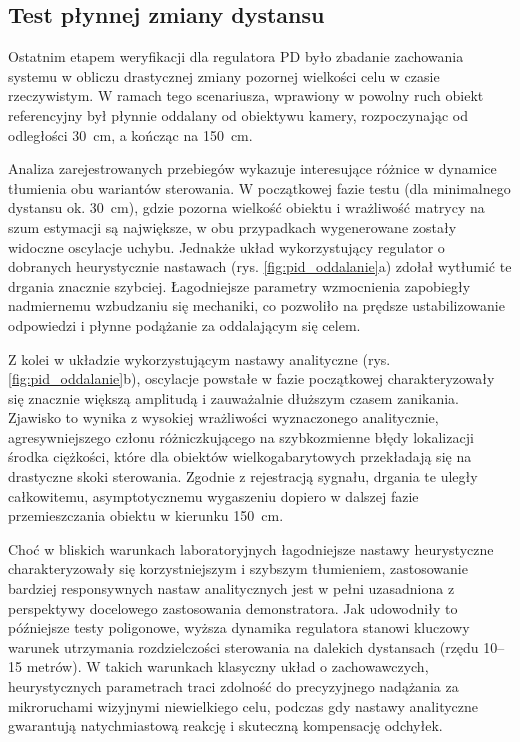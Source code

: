 \documentclass[a4paper,twoside,12pt]{book}
\begin{document}
\subsection{Test płynnej zmiany dystansu}
\label{subsec:pid_oddalanie}

Ostatnim etapem weryfikacji dla regulatora PD było zbadanie zachowania systemu w obliczu drastycznej zmiany pozornej wielkości celu w czasie rzeczywistym. W ramach tego scenariusza, wprawiony w powolny ruch obiekt referencyjny był płynnie oddalany od obiektywu kamery, rozpoczynając od odległości 30~cm, a kończąc na 150~cm. 

Analiza zarejestrowanych przebiegów wykazuje interesujące różnice w dynamice tłumienia obu wariantów sterowania. W początkowej fazie testu (dla minimalnego dystansu ok. 30~cm), gdzie pozorna wielkość obiektu i wrażliwość matrycy na szum estymacji są największe, w obu przypadkach wygenerowane zostały widoczne oscylacje uchybu. Jednakże układ wykorzystujący regulator o dobranych heurystycznie nastawach (rys. \ref{fig:pid_oddalanie}a) zdołał wytłumić te drgania znacznie szybciej. Łagodniejsze parametry wzmocnienia zapobiegły nadmiernemu wzbudzaniu się mechaniki, co pozwoliło na prędsze ustabilizowanie odpowiedzi i płynne podążanie za oddalającym się celem.

Z kolei w układzie wykorzystującym nastawy analityczne (rys. \ref{fig:pid_oddalanie}b), oscylacje powstałe w fazie początkowej charakteryzowały się znacznie większą amplitudą i zauważalnie dłuższym czasem zanikania. Zjawisko to wynika z wysokiej wrażliwości wyznaczonego analitycznie, agresywniejszego członu różniczkującego na szybkozmienne błędy lokalizacji środka ciężkości, które dla obiektów wielkogabarytowych przekładają się na drastyczne skoki sterowania. Zgodnie z rejestracją sygnału, drgania te uległy całkowitemu, asymptotycznemu wygaszeniu dopiero w dalszej fazie przemieszczania obiektu w kierunku 150~cm.

Choć w bliskich warunkach laboratoryjnych łagodniejsze nastawy heurystyczne charakteryzowały się korzystniejszym i szybszym tłumieniem, zastosowanie bardziej responsywnych nastaw analitycznych jest w pełni uzasadniona z perspektywy docelowego zastosowania demonstratora. Jak udowodniły to późniejsze testy poligonowe, wyższa dynamika regulatora stanowi kluczowy warunek utrzymania rozdzielczości sterowania na dalekich dystansach (rzędu 10--15 metrów). W takich warunkach klasyczny układ o zachowawczych, heurystycznych parametrach traci zdolność do precyzyjnego nadążania za mikroruchami wizyjnymi niewielkiego celu, podczas gdy nastawy analityczne gwarantują natychmiastową reakcję i skuteczną kompensację odchyłek.
\end{document}
